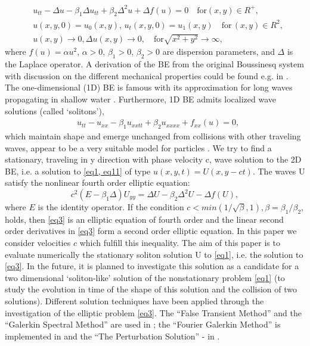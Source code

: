 \documentclass[12pt]{article}
\theoremstyle{theorem}
\theoremstyle{defi}
\begin{document}
\begin{align}
&u_{tt} - \Delta u -\beta_1  \Delta u_{tt} +\beta_2 \Delta ^2 u + \Delta f(u)=0 \quad \text{for} (x,y) \in R^{+} ,\label{eq1}
\\ \nonumber &u(x,y,0)=u_0(x,y), \, u_t(x,y,0)=u_1(x,y)   \quad\text{for} \, (x,y) \in R^2,
\\  &u(x,y) \rightarrow 0,  \Delta u(x,y) \rightarrow 0 ,  \quad \text{for}  \sqrt{x^2 + y^2} \rightarrow \infty, \label{eq11}
\end{align}
where   $f(u)=\alpha u^2$,  $\alpha>0$, $\beta_1>0$, $\beta_2>0$  are dispersion parameters, and $\Delta$ is the Laplace operator. A derivation of the BE from the original Boussinesq system with discussion on the different mechanical properties could be found e.g. in \cite{ref1}. 
The one-dimensional (1D) BE is famous with its approximation for long waves propagating in shallow water \cite{ref2, ref3}. Furthermore, 1D BE admits localized wave solutions (called ‘solitons’), 
\begin{align}
&u_{tt} - u_{xx} -\beta_1  u_{xxtt} +\beta_2 u_{xxxx} + f_{xx}(u) =0, \label{eq2}
\end{align}
which maintain shape and emerge unchanged from collisions with other traveling waves, appear to be a very suitable model for particles \cite{ref4, ref5}.
We try to find a stationary, traveling in y direction with phase velocity c, wave solution to the 2D BE, i.e. a solution to \ref{eq1, eq11} of type $u(x,y,t)=U(x,y - ct)$. The waves U satisfy the nonlinear fourth order elliptic equation:
\begin{equation}
c^2 (E-\beta_1 \Delta) U_{yy} = \Delta U -\beta_2 \Delta^2 U - \Delta f(U), \label{eq3}
\end{equation}
where $E$ is the identity operator. If the condition  $c<min(1/\sqrt{\beta}, 1), \beta = \beta_1/\beta_2$,   holds, then \ref{eq3} is an elliptic equation of fourth order and the linear second order derivatives in \ref{eq3} form a second order elliptic equation. In this paper we consider velocities $c$ which fulfill this inequality.
 The aim of this paper is to evaluate numerically the stationary soliton solution U to \ref{eq1}, i.e. the solution to \ref{eq3}. In the future, it is planned to investigate this solution as a candidate for a two dimensional ‘soliton-like’ solution of the nonstationary problem \ref{eq1} (to study the evolution in time of the shape of this solution and the collision of two solutions).
Different solution techniques have been applied through the investigation of the elliptic problem \ref{eq3}. The “False Transient Method” and the “Galerkin Spectral Method” are used in \cite{ref6,ref9} ; the “Fourier Galerkin Method” is implemented in \cite{ref8,ref9} and the “The Perturbation Solution” - in \cite{ref10}.
\end{document}
